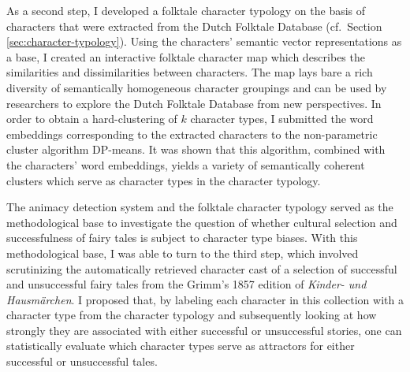 As a second step, I developed a folktale character typology on the basis of characters that were extracted from the Dutch Folktale Database (cf.\ Section \ref{sec:character-typology}). Using the characters' semantic vector representations as a base, I created an interactive folktale character map which describes the similarities and dissimilarities between characters. The map lays bare a rich diversity of semantically homogeneous character groupings and can be used by researchers to explore the Dutch Folktale Database from new perspectives. In order to obtain a hard-clustering of $k$ character types, I submitted the word embeddings corresponding to the extracted characters to the non-parametric cluster algorithm DP-means. It was shown that this algorithm, combined with the characters' word embeddings, yields a variety of semantically coherent clusters which serve as character types in the character typology.

The animacy detection system and the folktale character typology served as the methodological base to investigate the question of whether cultural selection and successfulness of fairy tales is subject to character type biases. With this methodological base, I was able to turn to the third step, which involved scrutinizing the automatically retrieved character cast of a selection of successful and unsuccessful fairy tales from the Grimm's 1857 edition of \emph{Kinder- und Hausmärchen}. I proposed that, by labeling each character in this collection with a character type from the character typology and subsequently looking at how strongly they are associated with either successful or unsuccessful stories, one can statistically evaluate which character types serve as attractors for either successful or unsuccessful tales. 

